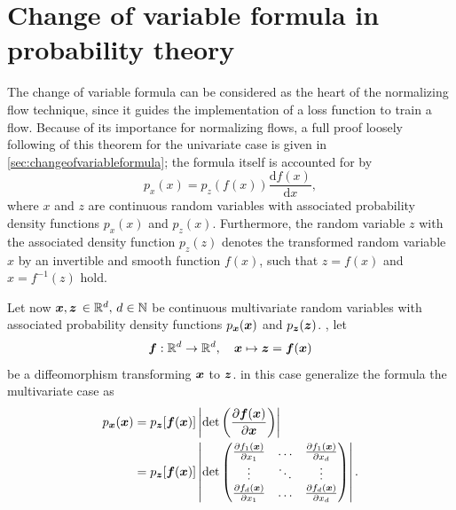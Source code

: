 \documentclass[a4paper,11pt]{report}
\def\fc#1{{\color{black}{#1}}} %
\def\lk#1{{\color{black}{#1}}}
\begin{document}
\section{Change of variable formula in probability theory}
The change of variable formula can be considered as the heart of the normalizing flow technique, since it guides the implementation of a loss function to train a flow. Because of its importance for normalizing flows, a full proof loosely following \cite[p.194-195]{Deisenroth.2020} of this theorem for the univariate case is given in \cref{sec:changeofvariableformula}; the formula itself is accounted for by \begin{equation}
	p_x(x) = p_z(f(x))\frac{\mathrm{d}f(x)}{\mathrm{d}x},
\end{equation} where $x$ and $z$ are continuous random variables with associated probability density functions $p_x(x)$ and $p_z(x)$. Furthermore, the random variable $z$ with the associated density function $p_z(z)$ denotes the transformed random variable $x$ by an invertible and smooth function $f(x)$, such that $z = f(x)$ and $x = f^{-1}(z)$ hold.

Let now $\bm{x}, \bm{z} \,\in\mathbb{R}^d,\,d\in\mathbb{N}$ be continuous multivariate random variables with associated probability density functions $p_{\bm{x}}(\bm{x})$ and $p_{\bm{z}}(\bm{z})$. \fc{In addition to this}, let 
\begin{equation} 
\bm{f}:\mathbb{R}^d \rightarrow \mathbb{R}^d, \quad \bm{x}\mapsto\bm{z} = \bm{f}(\bm{x}) 
\end{equation} be a diffeomorphism transforming $\bm{x}$ to $\bm{z}$. \cite[p.196]{Deisenroth.2020} in this case generalize the \lk{change of variable} formula \fc{from the univariate to} the multivariate case as \begin{align}\begin{aligned}
p_{\bm{x}}(\bm{x}) &= p_{\bm{z}}[\bm{f}(\bm{x})]\left|\det\left(\frac{\partial \bm{f}(\bm{x})}{\partial \bm{x}}\right)\right| \\ &= p_{\bm{z}}[\bm{f}(\bm{x})]\left|\det\begin{pmatrix}
\tfrac{\partial f_1(\bm{x})}{\partial x_1} & \dots & \tfrac{\partial f_1(\bm{x})}{\partial x_d} \\
\vdots & \ddots & \vdots \\
\tfrac{\partial f_d(\bm{x})}{\partial x_1} & \dots & \tfrac{\partial f_d(\bm{x})}{\partial x_d}
\end{pmatrix}\right|.
\end{aligned}\end{align}
\end{document}
